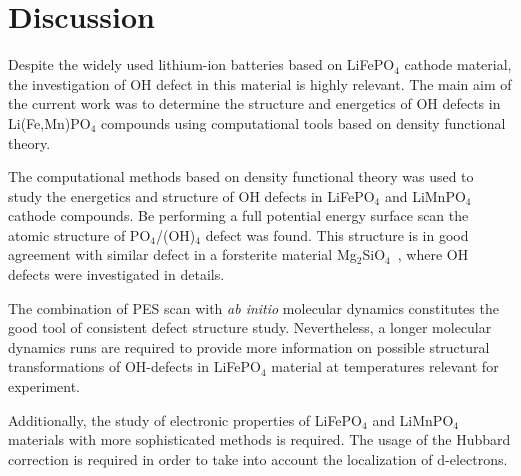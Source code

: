 \section{Discussion}

Despite the widely used lithium-ion batteries based on LiFePO$_4$ cathode material, the investigation of OH defect in this material is highly relevant. The main aim of the current work was to determine the structure and energetics of OH defects in Li(Fe,Mn)PO$_4$ compounds using computational tools based on density functional theory.

The computational methods based on density functional theory was used to study the energetics and structure of OH defects in LiFePO$_4$ and LiMnPO$_4$ cathode compounds. Be performing a full potential energy surface scan the atomic structure of PO$_4$/(OH)$_4$ defect was found. This structure is in good agreement with similar defect in a forsterite material Mg$_2$SiO$_4$~\cite{qin2018ab}, where OH defects were  investigated in details. 

The combination of PES scan with \textit{ab initio} molecular dynamics constitutes the good tool of consistent defect structure study. Nevertheless, a longer molecular dynamics runs are required to provide more information on possible structural transformations of OH-defects in LiFePO$_4$ material at temperatures relevant for experiment. 

Additionally, the study of electronic properties of LiFePO$_4$ and LiMnPO$_4$ materials with more sophisticated methods is required. The usage of the Hubbard correction is required in order to take into account the localization of d-electrons. 
